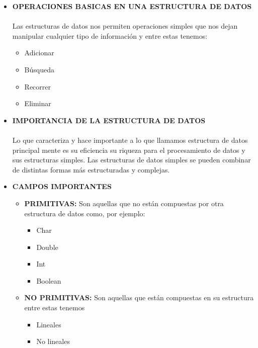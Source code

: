 \documentclass[twoside,twocolumn]{article}
\begin{document}
\begin{itemize}
	\item \textbf{OPERACIONES BASICAS EN UNA ESTRUCTURA DE DATOS}
	\\
	\\Las estructuras de datos nos permiten operaciones simples que nos dejan manipular cualquier tipo de información y entre estas tenemos:
	\begin{itemize}
		\item Adicionar
		\item Búsqueda
		\item Recorrer
		\item Eliminar
		
	\end{itemize}
	
	\item \textbf{IMPORTANCIA DE LA ESTRUCTURA DE DATOS}
	\\
	\\Lo que caracteriza y hace importante a lo que llamamos estructura de datos principal mente es su eficiencia su riqueza para el procesamiento de datos y sus estructuras simples. Las estructuras de datos simples se pueden combinar de distintas formas más estructuradas y complejas.
	\\
	\item \textbf{CAMPOS IMPORTANTES}
	
	\begin{itemize}
		\item \textbf{PRIMITIVAS:} Son aquellas que no están compuestas por otra estructura de datos como, por ejemplo:
        \begin{itemize}
            \item Char
            \item Double
            \item Int
            \item Boolean
        \end{itemize}
        \item \textbf{NO PRIMITIVAS:} Son aquellas que están compuestas en su estructura entre estas tenemos
        \begin{itemize}
            \item Lineales
            \item No lineales
        \end{itemize}
    \end{itemize}
    

\end{itemize}
\end{document}
